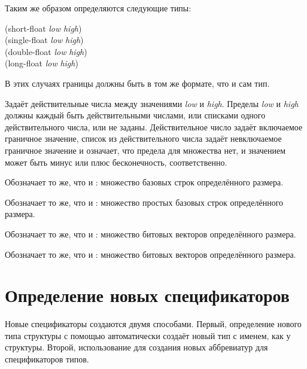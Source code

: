 \begin{flushdesc}
  Таким же образом определяются следующие типы:
  \begin{lisp}
    (short-float \emph{low} \emph{high}) \\
    (single-float \emph{low} \emph{high}) \\
    (double-float \emph{low} \emph{high}) \\
    (long-float \emph{low} \emph{high})
  \end{lisp}
  В этих случаях границы должны быть в том же формате, что и сам тип.

\item[\cd{(real \emph{low} \emph{high})}]
  Задаёт действительные числа между значениями \emph{low} и \emph{high}. Пределы
  \emph{low} и \emph{high} должны каждый быть действительными числами, или
  списками одного действительного числа, или не заданы.
  Действительное число задаёт включаемое граничное значение, список из
  действительного числа задаёт невключаемое граничное значение и \cd{*} означает,
  что предела для множества нет, и значением может быть минус или плюс
  бесконечность, соответственно.

\item[\cd{(base-string \emph{size})}]
  Обозначает то же, что и : множество
  базовых строк определённого размера.

\item[\cd{(simple-base-string \emph{size})}]
  Обозначает то же, что и : множество
  простых базовых строк определённого размера.

\item[\cd{(bit-vector \emph{size})}]
  Обозначает то же, что и : множество битовых
  векторов определённого размера.

\item[\cd{(simple-bit-vector \emph{size})}]
  Обозначает то же, что и : множество битовых
  векторов определённого размера.
\end{flushdesc}

\section{Определение новых спецификаторов}

Новые спецификаторы создаются двумя способами.
Первый, определение нового типа структуры с помощью  автоматически
создаёт новый тип с именем, как у структуры.
Второй, использование  для создания новых аббревиатур для
спецификаторов типов.

